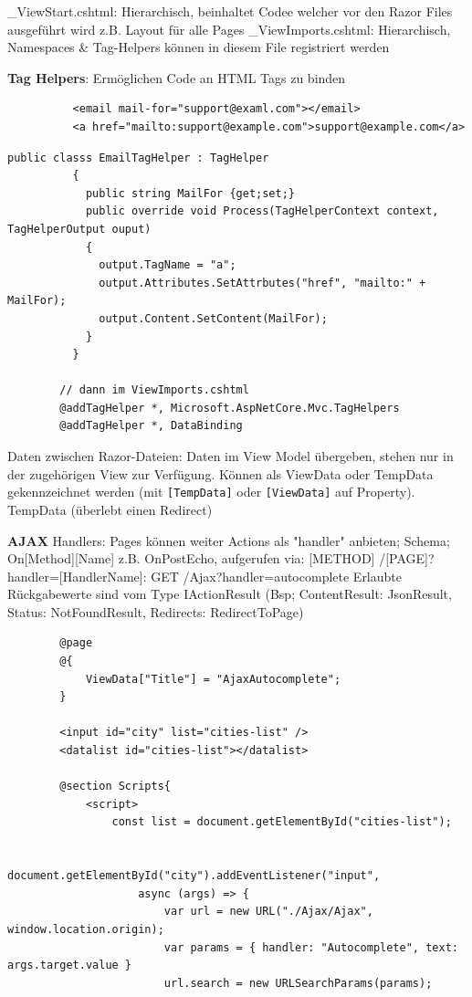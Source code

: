\documentclass[10pt,landscape]{article}
\begin{document}
\begin{multicols}{2}
        \_ViewStart.cshtml: Hierarchisch, beinhaltet Codee welcher vor den Razor Files ausgeführt wird z.B. Layout für alle Pages
        \_ViewImports.cshtml: Hierarchisch, Namespaces \& Tag-Helpers können in diesem File registriert werden

        \textbf{Tag Helpers}: Ermöglichen Code an HTML Tags zu binden
        \begin{lstlisting}
          <email mail-for="support@examl.com"></email>
          <a href="mailto:support@example.com">support@example.com</a>
        \end{lstlisting}\begin{lstlisting}[style=CSharp]
          public classs EmailTagHelper : TagHelper 
          {
            public string MailFor {get;set;}
            public override void Process(TagHelperContext context, TagHelperOutput ouput)
            {
              output.TagName = "a";
              output.Attributes.SetAttrbutes("href", "mailto:" + MailFor);
              output.Content.SetContent(MailFor);
            }
          }

        // dann im ViewImports.cshtml
        @addTagHelper *, Microsoft.AspNetCore.Mvc.TagHelpers
        @addTagHelper *, DataBinding
        \end{lstlisting}

        Daten zwischen Razor-Dateien: Daten im View Model übergeben, stehen nur in der zugehörigen View zur Verfügung.
        Können als ViewData oder TempData gekennzeichnet werden (mit \lstinline{[TempData]} oder \lstinline{[ViewData]} auf Property).
        TempData (überlebt einen Redirect)

        \textbf{AJAX}
        Handlers: Pages können weiter Actions als "handler" anbieten; Schema; On[Method][Name] z.B. OnPostEcho, aufgerufen via: [METHOD] /[PAGE]?handler=[HandlerName]: GET /Ajax?handler=autocomplete
        Erlaubte Rückgabewerte sind vom Type IActionResult (Bsp; ContentResult: JsonResult, Status: NotFoundResult, Redirects: RedirectToPage)

        \begin{lstlisting}
        @page
        @{
            ViewData["Title"] = "AjaxAutocomplete";
        }

        <input id="city" list="cities-list" />
        <datalist id="cities-list"></datalist>

        @section Scripts{
            <script>
                const list = document.getElementById("cities-list");

                document.getElementById("city").addEventListener("input",
                    async (args) => {
                        var url = new URL("./Ajax/Ajax", window.location.origin);
                        var params = { handler: "Autocomplete", text: args.target.value }
                        url.search = new URLSearchParams(params);


\end{lstlisting}
\end{multicols}
\end{document}
